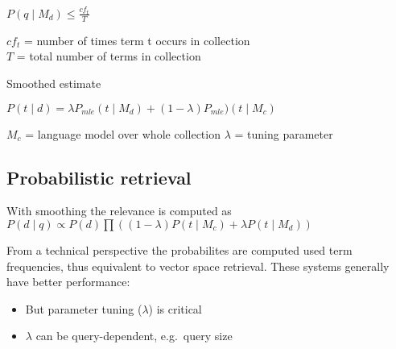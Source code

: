 $ P(q \mid M_d) \leq \frac{cf_t}{T} $

$ cf_t $ = number of times term t occurs in collection \\
$ T $ = total number of terms in collection

Smoothed estimate

$ P(t \mid d) = \lambda P_{mle} (t \mid M_d) + (1 - \lambda) P_{mle}
)(t \mid M_c) $

$ M_c $ = language model over whole collection
$ \lambda $ = tuning parameter

\subsection{Probabilistic retrieval}

With smoothing the relevance is computed as
$ P(d \mid q) \propto P(d) \prod ((1 - \lambda) P(t \mid M_c) +
\lambda P(t \mid M_d)) $

From a technical perspective the probabilites are computed used term
frequencies, thus equivalent to vector space retrieval. These systems generally have better performance:
\begin{itemize}
\item But parameter tuning ($ \lambda $) is critical
\item $ \lambda $ can be query-dependent, e.g.\ query size
\end{itemize}


